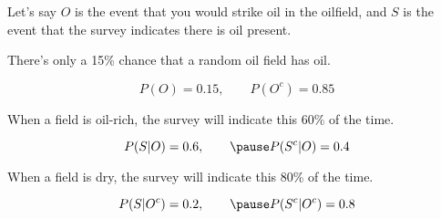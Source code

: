 \documentclass{beamer}\usepackage[]{graphicx}\usepackage[]{color}
\begin{document}
\begin{darkframes}
    \begin{frame}
      Let's say $O$ is the event that you would strike oil in the oilfield, and $S$ is the event that the survey indicates there is oil present.

      \bigskip\pause

      There's only a 15\% chance that a random oil field has oil.

      \[  P(O) = 0.15, \qquad P(O^c) = 0.85 \]

      \bigskip\pause

      When a field is oil-rich, the survey will indicate this 60\% of the time.

      \pause

      \[ P(S|O) = 0.6, \qquad\pause P(S^c|O) = 0.4 \]

      \pause

      When a field is dry, the survey will indicate this 80\% of the time.

      \pause

      \[ P(S|O^c) = 0.2, \qquad\pause P(S^c|O^c) = 0.8 \]
    \end{frame}


\end{darkframes}
\end{document}
